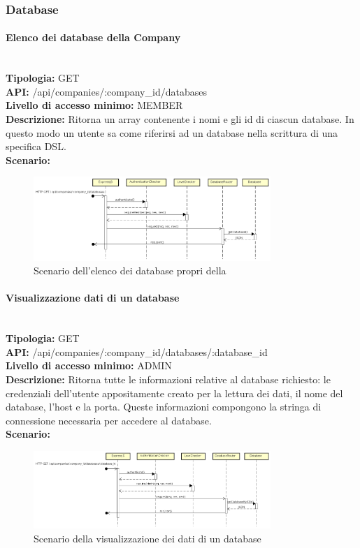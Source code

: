 \newpage
\subsubsection{Database}
\paragraph{Elenco dei database della Company}\mbox{}\\
\textbf{Tipologia:} GET \\
\textbf{API:} /api/companies/:company\_id/databases \\
\textbf{Livello di accesso minimo:} MEMBER \\
\textbf{Descrizione:} Ritorna un array contenente i nomi e gli id di ciascun database. In questo modo un utente sa come riferirsi ad un database nella scrittura di una specifica DSL. \\
\textbf{Scenario:}
\begin{figure}[H]
\centering
\includegraphics[width=0.8\textwidth]{res/sections/backend/sequence/(GET)database.png}
\caption{Scenario dell'elenco dei database propri della }
\end{figure}

\newpage
\paragraph{Visualizzazione dati di un database}\mbox{}\\
\textbf{Tipologia:} GET \\
\textbf{API:} /api/companies/:company\_id/databases/:database\_id \\
\textbf{Livello di accesso minimo:} ADMIN \\
\textbf{Descrizione:} Ritorna tutte le informazioni relative al database richiesto: le credenziali dell'utente appositamente creato per la lettura dei dati, il nome del database, l'host e la porta. Queste informazioni compongono la stringa di connessione necessaria per accedere al database. \\
\textbf{Scenario:} 
\begin{figure}[H]
\centering
\includegraphics[width=0.8\textwidth]{res/sections/backend/sequence/(GET)databaseById.png}
\caption{Scenario della visualizzazione dei dati di un database}
\end{figure}

